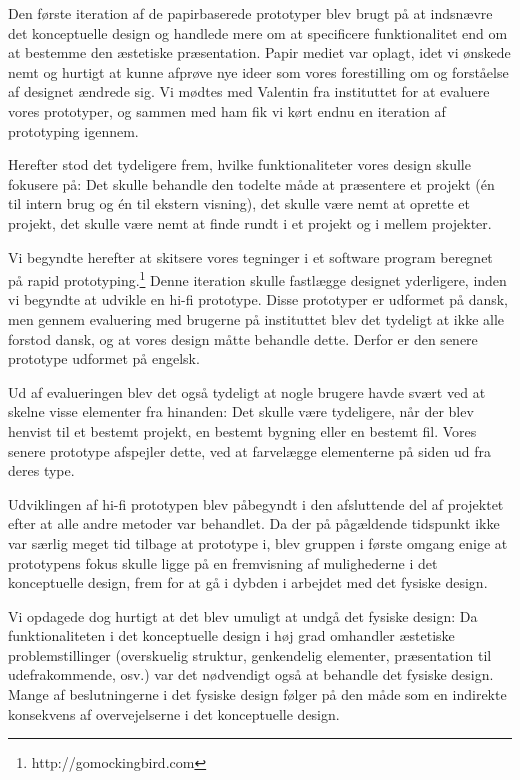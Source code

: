 Den første iteration af de papirbaserede prototyper blev brugt på at indsnævre det konceptuelle design og handlede mere om at specificere funktionalitet end om at bestemme den æstetiske præsentation. Papir mediet var oplagt, idet vi ønskede nemt og hurtigt at kunne afprøve nye ideer som vores forestilling om og forståelse af designet ændrede sig. Vi mødtes med Valentin fra instituttet for at evaluere vores prototyper, og sammen med ham fik vi kørt endnu en iteration af prototyping igennem. 

Herefter stod det tydeligere frem, hvilke funktionaliteter vores design skulle fokusere på: Det skulle behandle den todelte måde at præsentere et projekt (én til intern brug og én til ekstern visning), det skulle være nemt at oprette et projekt, det skulle være nemt at finde rundt i et projekt og i mellem projekter. 

Vi begyndte herefter at skitsere vores tegninger i et software program beregnet på rapid prototyping.\footnote{http://gomockingbird.com} Denne iteration skulle fastlægge designet yderligere, inden vi begyndte at udvikle en hi-fi prototype. Disse prototyper er udformet på dansk, men gennem evaluering med brugerne på instituttet blev det tydeligt at ikke alle forstod dansk, og at vores design måtte behandle dette. Derfor er den senere prototype udformet på engelsk. 

Ud af evalueringen blev det også tydeligt at nogle brugere havde svært ved at skelne visse elementer fra hinanden: Det skulle være tydeligere, når der blev henvist til et bestemt projekt, en bestemt bygning eller en bestemt fil. Vores senere prototype afspejler dette, ved at farvelægge elementerne på siden ud fra deres type.

Udviklingen af hi-fi prototypen blev påbegyndt i den afsluttende del af projektet efter at alle andre metoder var behandlet. Da der på pågældende tidspunkt ikke var særlig meget tid tilbage at prototype i, blev gruppen i første omgang enige at prototypens fokus skulle ligge på en fremvisning af mulighederne i det konceptuelle design, frem for at gå i dybden i arbejdet med det fysiske design. 

Vi opdagede dog hurtigt at det blev umuligt at undgå det fysiske design: Da funktionaliteten i det konceptuelle design i høj grad omhandler æstetiske problemstillinger (overskuelig struktur, genkendelig elementer, præsentation til udefrakommende, osv.) var det nødvendigt også at behandle det fysiske design. Mange af beslutningerne i det fysiske design følger på den måde som en indirekte konsekvens af overvejelserne i det konceptuelle design.

